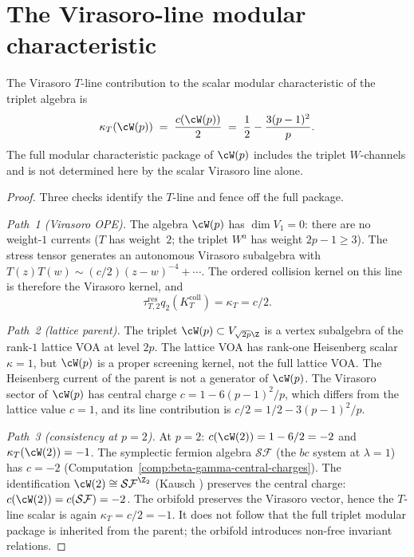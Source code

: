 
\section{The Virasoro-line modular characteristic}\label{sec:wp-kappa}

\begin{proposition}\label{prop:wp-kappa}
The Virasoro $T$-line contribution to the scalar modular
characteristic of the triplet algebra is
\begin{equation}\label{eq:wp-kappa}
 \kappa_T(\cW(p)) \;=\; \frac{c(\cW(p))}{2}
 \;=\; \frac{1}{2} - \frac{3(p-1)^2}{p}.
\end{equation}
The full modular characteristic package of $\cW(p)$ includes the
triplet $W$-channels and is not determined here by the scalar
Virasoro line alone.
\end{proposition}

\begin{proof}
Three checks identify the $T$-line and fence off the full package.

\emph{Path~1 (Virasoro OPE).}
The algebra $\cW(p)$ has $\dim V_1 = 0$: there are no weight-$1$
currents ($T$ has weight~$2$; the triplet $W^a$ has weight
$2p - 1 \geq 3$). The stress tensor generates an
autonomous Virasoro subalgebra with
$T(z)T(w)\sim (c/2)(z-w)^{-4}+\cdots$. The ordered collision
kernel on this line is therefore the Virasoro kernel, and
\[
 \tau_{T,2}^{\mathrm{res}}q_2(K_T^{\mathrm{coll}})=\kappa_T=c/2.
\]

\emph{Path~2 (lattice parent).}
The triplet $\cW(p) \subset V_{\sqrt{2p}\Z}$ is a vertex
subalgebra of the rank-$1$ lattice VOA at level $2p$. The
lattice VOA has rank-one Heisenberg scalar $\kappa=1$, but
$\cW(p)$ is a proper screening kernel, not the full lattice VOA.
The Heisenberg current of the parent is not a generator of
$\cW(p)$. The Virasoro sector of $\cW(p)$ has central
charge $c = 1 - 6(p-1)^2/p$, which differs from the lattice value
$c = 1$, and its line contribution is
$c/2=1/2-3(p-1)^2/p$.

\emph{Path~3 (consistency at $p = 2$).}
At $p = 2$: $c(\cW(2)) = 1 - 6/2 = -2$ and
$\kappa_T(\cW(2)) = -1$.
The symplectic fermion algebra $\mathcal{SF}$ (the $bc$ system
at $\lambda = 1$) has $c = -2$
(Computation~\ref{comp:beta-gamma-central-charges}).
The identification
$\cW(2) \cong \mathcal{SF}^{\Z_2}$ (Kausch
\cite{Kausch2000})
preserves the central charge: $c(\cW(2)) = c(\mathcal{SF}) = -2$.
The orbifold preserves the Virasoro vector, hence the $T$-line
scalar is again $\kappa_T=c/2=-1$. It does not follow that the
full triplet modular package is inherited from the parent; the
orbifold introduces non-free invariant relations.
\end{proof}

